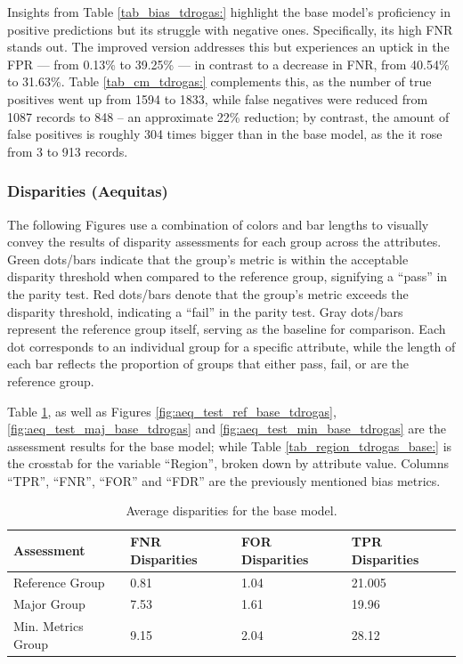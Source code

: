 \documentclass[fleqn,10pt]{wlscirep}
\begin{document}
Insights from Table \ref{tab_bias_tdrogas:} highlight the base model's proficiency in positive predictions but its struggle with negative ones. Specifically, its high FNR stands out. The improved version addresses this but experiences an uptick in the FPR — from 0.13\% to 39.25\% — in contrast to a decrease in FNR, from 40.54\% to 31.63\%. Table \ref{tab_cm_tdrogas:} complements this, as the number of true positives went up from 1594 to 1833, while false negatives were reduced from 1087 records to 848 -- an approximate 22\% reduction; by contrast, the amount of false positives is roughly 304 times bigger than in the base model, as the it rose from 3 to 913 records.

\subsubsection{Disparities (Aequitas)}

The following Figures use a combination of colors and bar lengths to visually convey the results of disparity assessments for each group across the attributes. Green dots/bars indicate that the group’s metric is within the acceptable disparity threshold when compared to the reference group, signifying a “pass” in the parity test. Red dots/bars denote that the group’s metric exceeds the disparity threshold, indicating a “fail” in the parity test. Gray dots/bars represent the reference group itself, serving as the baseline for comparison. Each dot corresponds to an individual group for a specific attribute, while the length of each bar reflects the proportion of groups that either pass, fail, or are the reference group. 

Table \ref{tab_asses_base_tdrogas:}, as well as Figures \ref{fig:aeq_test_ref_base_tdrogas}, \ref{fig:aeq_test_maj_base_tdrogas} and \ref{fig:aeq_test_min_base_tdrogas} are the assessment results for the base model; while Table \ref{tab_region_tdrogas_base:} is the crosstab for the variable ``Region'', broken down by attribute value. Columns ``TPR'', ``FNR'', ``FOR'' and ``FDR'' are the previously mentioned bias metrics.

\begin{table}[!htb]
\centering
\begin{tabular}{|p{70pt}|p{2cm}|p{2cm}|p{2cm}|}\hline
        \textbf{Assessment} & \textbf{FNR \break Disparities} & \textbf{FOR \break Disparities} & \textbf{TPR \break Disparities} \\ \hline
        Reference Group & 0.81 & 1.04 & 21.005   \\ 
        Major Group & 7.53 & 1.61 & 19.96  \\
        Min. Metrics Group & 9.15 & 2.04 & 28.12 \\ 
        \hline
    \end{tabular}
    \caption{Average disparities for the base model.}
\label{tab_asses_base_tdrogas:}
\end{table}
\end{document}
